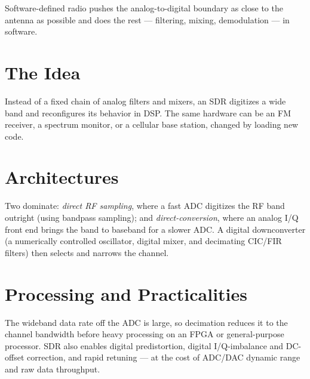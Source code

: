 Software-defined radio pushes the analog-to-digital boundary as close to the
antenna as possible and does the rest --- filtering, mixing, demodulation --- in
software.

\section{The Idea}
Instead of a fixed chain of analog filters and mixers, an SDR digitizes a wide
band and reconfigures its behavior in DSP. The same hardware can be an FM
receiver, a spectrum monitor, or a cellular base station, changed by loading new
code.

\section{Architectures}
Two dominate: \emph{direct RF sampling}, where a fast ADC digitizes the RF band
outright (using bandpass sampling); and \emph{direct-conversion}, where an
analog I/Q front end brings the band to baseband for a slower ADC. A digital
downconverter (a numerically controlled oscillator, digital mixer, and decimating
CIC/FIR filters) then selects and narrows the channel.

\section{Processing and Practicalities}
The wideband data rate off the ADC is large, so decimation reduces it to the
channel bandwidth before heavy processing on an FPGA or general-purpose
processor. SDR also enables digital predistortion, digital I/Q-imbalance and
DC-offset correction, and rapid retuning --- at the cost of ADC/DAC dynamic range
and raw data throughput.
